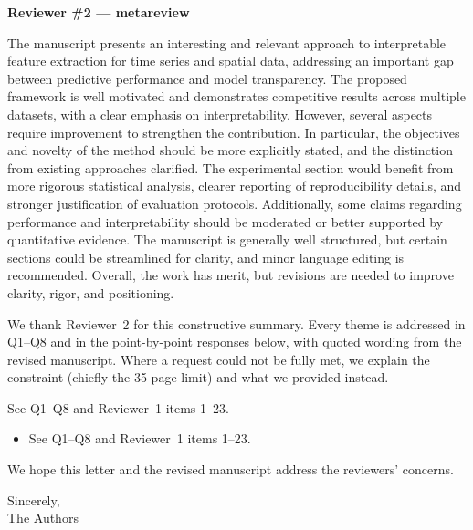 \documentclass[11pt]{article}
\makeatletter
\newcommand{\rsp}{\par\vspace{0.9em}}
\newcommand{\rcitem}[2]{\begin{reviewerbox}\textbf{#1}\par\smallskip#2\end{reviewerbox}}
\newcommand{\response}[2]{%
  \begin{responsebox}#1%
  \def\@responseitems{#2}%
  \ifx\@responseitems\empty\else\begin{itemize}[nosep,leftmargin=1.2em]#2\end{itemize}\fi
  \end{responsebox}\rsp}
\makeatother
\begin{document}
\rcitem{Reviewer \#2 --- metareview}{The manuscript presents an interesting and relevant approach
to interpretable feature extraction for time series and spatial data, addressing an important gap
between predictive performance and model transparency. The proposed framework is well motivated and
demonstrates competitive results across multiple datasets, with a clear emphasis on
interpretability. However, several aspects require improvement to strengthen the contribution. In
particular, the objectives and novelty of the method should be more explicitly stated, and the
distinction from existing approaches clarified. The experimental section would benefit from more
rigorous statistical analysis, clearer reporting of reproducibility details, and stronger
justification of evaluation protocols. Additionally, some claims regarding performance and
interpretability should be moderated or better supported by quantitative evidence. The manuscript
is generally well structured, but certain sections could be streamlined for clarity, and minor
language editing is recommended. Overall, the work has merit, but revisions are needed to improve
clarity, rigor, and positioning.}

\response{We thank Reviewer~2 for this constructive summary. Every theme is addressed in Q1--Q8 and
in the point-by-point responses below, with quoted wording from the revised manuscript. Where a
request could not be fully met, we explain the constraint (chiefly the 35-page limit) and what we
provided instead.}{
  \item See Q1--Q8 and Reviewer~1 items 1--23.
}

\vspace{1em}
\noindent We hope this letter and the revised manuscript address the reviewers' concerns.

\vspace{0.8em}
\noindent Sincerely,\\
The Authors
\end{document}
